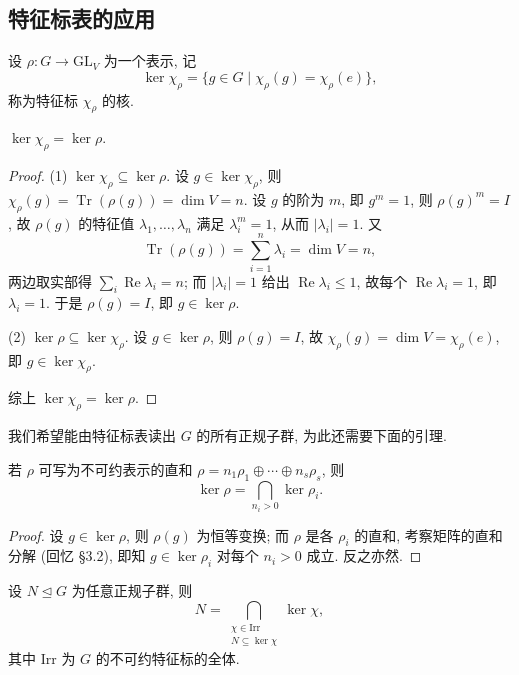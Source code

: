 \subsection{特征标表的应用}

\begin{definition}[特征标的核]\label{def:kernel-of-character}
设 $\rho\colon G\to\mathrm{GL}_V$ 为一个表示, 记
\[
  \ker\chi_\rho=\{g\in G\mid \chi_\rho(g)=\chi_\rho(e)\},
\]
称为特征标 $\chi_\rho$ 的核.
\end{definition}

\begin{proposition}\label{prop:kernel-equality}
$\ker\chi_\rho=\ker\rho$.
\end{proposition}

\begin{proof}
\mbox{}\par\vspace{-0.2em}
(1) $\ker\chi_\rho\subseteq\ker\rho$. 设 $g\in\ker\chi_\rho$, 则
$\chi_\rho(g)=\operatorname{Tr}(\rho(g))=\dim V=n$. 设 $g$ 的阶为 $m$, 即 $g^m=1$,
则 $\rho(g)^m=I$, 故 $\rho(g)$ 的特征值 $\lambda_1,\dots,\lambda_n$ 满足
$\lambda_i^m=1$, 从而 $|\lambda_i|=1$. 又
\[
  \operatorname{Tr}(\rho(g))=\sum_{i=1}^{n}\lambda_i=\dim V=n,
\]
两边取实部得 $\sum_i\operatorname{Re}\lambda_i=n$; 而 $|\lambda_i|=1$ 给出
$\operatorname{Re}\lambda_i\le1$, 故每个 $\operatorname{Re}\lambda_i=1$, 即 $\lambda_i=1$.
于是 $\rho(g)=I$, 即 $g\in\ker\rho$.

(2) $\ker\rho\subseteq\ker\chi_\rho$. 设 $g\in\ker\rho$, 则 $\rho(g)=I$,
故 $\chi_\rho(g)=\dim V=\chi_\rho(e)$, 即 $g\in\ker\chi_\rho$.

综上 $\ker\chi_\rho=\ker\rho$.
\end{proof}

我们希望能由特征标表读出 $G$ 的所有正规子群, 为此还需要下面的引理.

\begin{lemma}\label{lem:kernel-of-direct-sum}
若 $\rho$ 可写为不可约表示的直和 $\rho=n_1\rho_1\oplus\cdots\oplus n_s\rho_s$, 则
\[
  \ker\rho=\bigcap_{n_i>0}\ker\rho_i .
\]
\end{lemma}

\begin{proof}
设 $g\in\ker\rho$, 则 $\rho(g)$ 为恒等变换; 而 $\rho$ 是各 $\rho_i$ 的直和,
考察矩阵的直和分解 (回忆 \S 3.2), 即知 $g\in\ker\rho_i$ 对每个 $n_i>0$ 成立.
反之亦然.
\end{proof}



\begin{theorem}\label{thm:normal-subgroup-as-kernel}
设 $N\trianglelefteq G$ 为任意正规子群, 则
\[
  N=\bigcap_{\substack{\chi\in\mathrm{Irr}\\ N\subseteq\ker\chi}}\ker\chi,
\]
其中 $\mathrm{Irr}$ 为 $G$ 的不可约特征标的全体.
\end{theorem}

